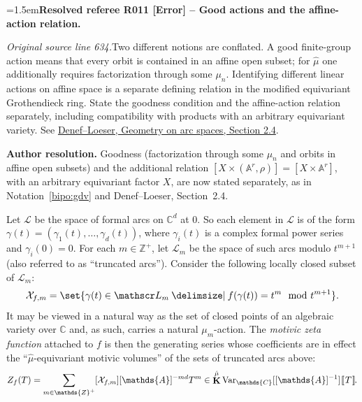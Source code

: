 \documentclass[12pt]{amsart}
\newcommand{\ResolvedRefereeRemark}[5]{%
  \par\medskip\begingroup\normalfont\small\color{gray}%
  \emergencystretch=1.5em\noindent\textbf{Resolved referee R#1 [#2] -- #3.}\par\nobreak\noindent #4\par
  \medskip\color{ResolutionGreen}\noindent\textbf{Author resolution.} #5\par
  \endgroup\medskip
}
\newcommand{\memph}[1]{{\color{magenta}\emph{#1}}}
\theoremstyle{plain}
\theoremstyle{definition}
\theoremstyle{remark}
\numberwithin{equation}{section}
\theoremstyle{plain}
\newcommand{\Z}{\mathds{Z}}
\newcommand{\A}{\mathds{A}}
\newcommand{\C}{\mathds{C}}
\newcommand{\0}{\emptyset}
\newcommand{\dbra}[1]{%
  \,[\mkern-6.8mu[\, #1 \,]\mkern-6.8mu]}
\newcommand{\mdl}[1]{\mathcal{#1}}  %
\providecommand\given{}
\newcommand\SetSymbol[1][]{%
\nonscript \: #1 \vert
\allowbreak
\nonscript\:
\mathopen{}}
\renewcommand\given{\SetSymbol[\delimsize]}
\DeclareMathOperator{\ggk}{\mathbf{K}}
\newcommand{\var}{\textup{Var}}
\newcommand{\gmv}{\ggk^{\hat \mu}\var_{\C}}
\begin{document}
\ResolvedRefereeRemark{011}{Error}{Good actions and the affine-action relation}{%
\textit{Original source line 634.}\quad Two different notions are conflated. A good finite-group action means that every orbit is contained in an affine open subset; for $\hat\mu$ one additionally requires factorization through some $\mu_n$. Identifying different linear actions on affine space is a separate defining relation in the modified equivariant Grothendieck ring. State the goodness condition and the affine-action relation separately, including compatibility with products with an arbitrary equivariant variety. See \href{https://arxiv.org/pdf/math/0006050}{Denef--Loeser, Geometry on arc spaces, Section 2.4}.
}{Goodness (factorization through some $\mu_n$ and orbits in affine open subsets) and the additional relation $[X \times (\A^r,\rho)] = [X \times \A^r]$, with an arbitrary equivariant factor $X$, are now stated separately, as in Notation~\ref{bipo:gdv} and Denef--Loeser, Section~2.4.}

Let $\mathscr L$ be the space of formal arcs on $\C^d$ at $0$. So each element in $\mathscr L$ is of the form $\gamma(t) = (\gamma_1(t), \ldots, \gamma_d(t))$, where $\gamma_i(t)$ is a complex formal power series and $\gamma_i(0) = 0$. For each $m \in \Z^+$, let $\mathscr L_m$ be the space of such arcs modulo $t^{m+1}$ (also referred to as ``truncated arcs''). Consider the following locally closed subset of $\mathscr L_m$:
\begin{equation*}
  \mdl X_{f,m}  = \set{\gamma(t) \in \mathscr L_m \given f(\gamma(t)) = t^m \mod t^{m+1} }.
\end{equation*}
It may be viewed in a natural way as the set of closed points of an algebraic variety over $\C$ and, as such, carries a natural $\mu_{m}$-action. The \memph{motivic zeta function} attached to $f$ is then the generating series whose coefficients are in effect the ``$\hat \mu$-equivariant motivic volumes'' of the sets of truncated arcs above:
\[
 Z_f(T) = \sum_{m \in \Z^+} [\mdl X_{f,m}] [\A]^{-md}T^m \in \gmv[[\A]^{-1}] \dbra{T}.
\]
\end{document}
